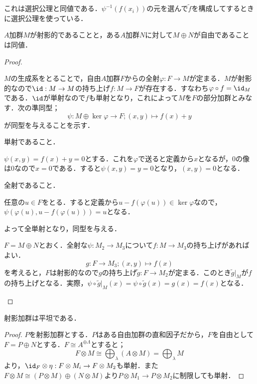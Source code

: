 これは選択公理と同値である．$\psi^{-1}(f(x_i))$の元を選んで$\widetilde{f}$を構成してするときに選択公理を使っている．
\begin{thm}
	$A$加群$M$が射影的であることと，ある$A$加群$N$に対して$M\oplus N$が自由であることは同値．
\end{thm}
\begin{proof}
	\begin{eqv}
		\item 
		$M$の生成系をとることで，自由$A$加群$F$からの全射$\varphi:F\to M$が定まる．$M$が射影的なので$\id:M\to M$の持ち上げ$f:M\to F$が存在する．すなわち$\varphi\circ f=\id_M$である．$\id$が単射なので$f$も単射となり，これによって$M$を$F$の部分加群とみなす．次の準同型；
		\[\psi:M\oplus \ker\varphi\to F;(x,y)\mapsto f(x)+y\]
		が同型を与えることを示す．
		
		\begin{mrkw}
			\item 単射であること．
			
			$\psi(x,y)=f(x)+y=0$とする．これを$\varphi$で送ると定義から$x$となるが，0の像は0なので$x=0$である．すると$\psi(x,y)=y=0$となり，$(x,y)=0$となる．
			\item 全射であること．
			
			任意の$u\in F$をとる．すると定義から$u-f(\varphi(u))\in\ker\varphi$なので，$\psi(\varphi(u),u-f(\varphi(u)))=u$となる．
		\end{mrkw}
		よって全単射となり，同型を与える．
		\item 
		$F=M\oplus N$とおく．全射な$\psi:M_2\to M_3$について$f:M\to M_3$の持ち上げがあればよい．
		\[g:F\to M_3;(x,y)\mapsto f(x)\]
		を考えると，$F$は射影的なので$g$の持ち上げ$\widetilde{g}:F\to M_2$が定まる．このとき$\widetilde{g}|_M$が$f$の持ち上げとなる．実際，$\psi\circ\widetilde{g}|_M(x)=\psi\circ\widetilde{g}(x)=g(x)=f(x)$となる．
	\end{eqv}
\end{proof}

\begin{thm}
	射影加群は平坦である．
\end{thm}
\begin{proof}
	$P$を射影加群とする．$P$はある自由加群の直和因子だから，$F$を自由として$F=P\oplus N$とする．$F\cong A^{\oplus\Lambda}$とすると；
	\[F\otimes M\cong \bigoplus_\lambda (A\otimes M)=\bigoplus_\lambda M\]
	より，$\id_{F}\otimes\eta:F\otimes M_i\to F\otimes M_2$も単射．また$F\otimes M\cong (P\otimes M)\oplus (N\otimes M)$より$P\otimes M_1\to P\otimes M_2$に制限しても単射．
\end{proof}

